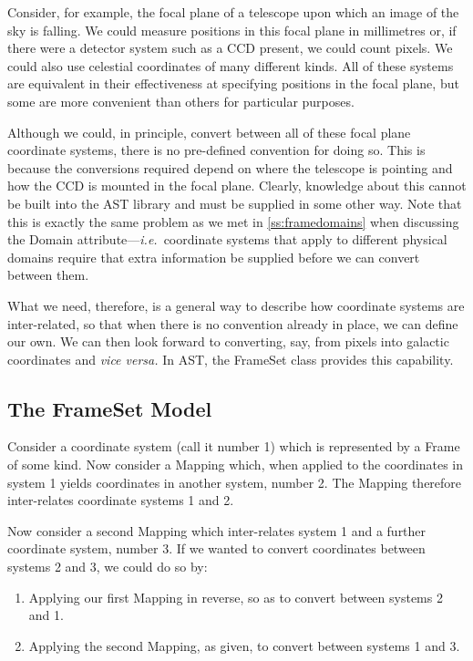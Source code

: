 \documentclass[twoside,11pt]{article}
\newcommand{\secref}[1]{\S\ref{#1}}
\renewcommand{\secref}[1]{\ref{#1}}
\begin{document}
Consider, for example, the focal plane of a telescope upon which an
image of the sky is falling. We could measure positions in this focal
plane in millimetres or, if there were a detector system such as a CCD
present, we could count pixels. We could also use celestial
coordinates of many different kinds. All of these systems are
equivalent in their effectiveness at specifying positions in the focal
plane, but some are more convenient than others for particular
purposes.

Although we could, in principle, convert between all of these focal
plane coordinate systems, there is no pre-defined convention for doing
so. This is because the conversions required depend on where the
telescope is pointing and how the CCD is mounted in the focal
plane. Clearly, knowledge about this cannot be built into the AST
library and must be supplied in some other way. Note that this is
exactly the same problem as we met in \secref{ss:framedomains} when
discussing the Domain attribute---{\em{i.e.}}\ coordinate systems that
apply to different physical domains require that extra information be
supplied before we can convert between them.

What we need, therefore, is a general way to describe how coordinate
systems are inter-related, so that when there is no convention already
in place, we can define our own. We can then look forward to
converting, say, from pixels into galactic coordinates and {\em{vice
versa.}}  In AST, the FrameSet class provides this capability.

\subsection{The FrameSet Model}

Consider a coordinate system (call it number 1) which is represented
by a Frame of some kind. Now consider a Mapping which, when applied to
the coordinates in system 1 yields coordinates in another system,
number 2. The Mapping therefore inter-relates coordinate systems 1 and
2.

Now consider a second Mapping which inter-relates system 1 and a
further coordinate system, number 3. If we wanted to convert
coordinates between systems 2 and 3, we could do so by:

\begin{enumerate}
\item Applying our first Mapping in reverse, so as to convert between
systems 2 and 1.

\item Applying the second Mapping, as given, to convert between
systems 1 and 3.
\end{enumerate}
\end{document}
